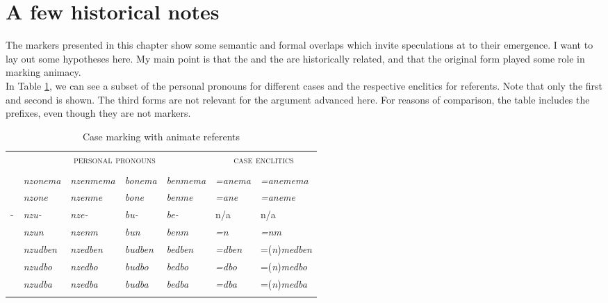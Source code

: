 \section{A few historical notes}\label{casenotes}

The  markers presented in this chapter show some semantic and formal overlaps which invite speculations at to their emergence. I want to lay out some hypotheses here. My main point is that the  and the  are historically related, and that the original form played some role in marking animacy.\\

In Table \ref{casediscussionss}, we can see a subset of the personal pronouns for different cases and the respective  enclitics for  referents. Note that only the first and second  is shown. The third  forms are not relevant for the argument advanced here. For reasons of comparison, the table includes the  prefixes, even though they are not  markers.

\begin{table}[H]
\begin{center}
\caption{Case marking with animate referents} 
\label{casediscussionss} 
	\begin{tabular}{lllllll}	
		\lsptoprule
		&\multicolumn{4}{c}{\textsc{personal pronouns}}&\multicolumn{2}{c}{\textsc{case enclitics}}\\
		&\Fsg{}&\Fnsg{}&\Ssg{}&\Snsg{}&\Sg{}&\Nsg{}\\ \hline
		\Char{}&\emph{nzonema}&\emph{nzenmema}&\emph{bonema}&\emph{benmema}&\emph{=anema}&\emph{=anemema}\\
		\Poss{}&\emph{nzone}&\emph{nzenme}&\emph{bone}&\emph{benme}&\emph{=ane}&\emph{=aneme}\\ 
		\Poss-&\emph{nzu-}&\emph{nze-}&\emph{bu-}&\emph{be-}&n/a&n/a\\ 
		\Dat{}&\emph{nzun}&\emph{nzenm}&\emph{bun}&\emph{benm}&\emph{=n}&\emph{=nm}\\ 
		\Loc{}&\emph{nzudben}&\emph{nzedben}&\emph{budben}&\emph{bedben}&\emph{=dben}&=(\emph{n})\emph{medben}\\ 
		\All{}&\emph{nzudbo}&\emph{nzedbo}&\emph{budbo}&\emph{bedbo}&\emph{=dbo}&=(\emph{n})\emph{medbo}\\ 
		\Abl{}&\emph{nzudba}&\emph{nzedba}&\emph{budba}&\emph{bedba}&\emph{=dba}&=(\emph{n})\emph{medba}\\ 
		\lspbottomrule
	\end{tabular}
\end{center}
\end{table}%

